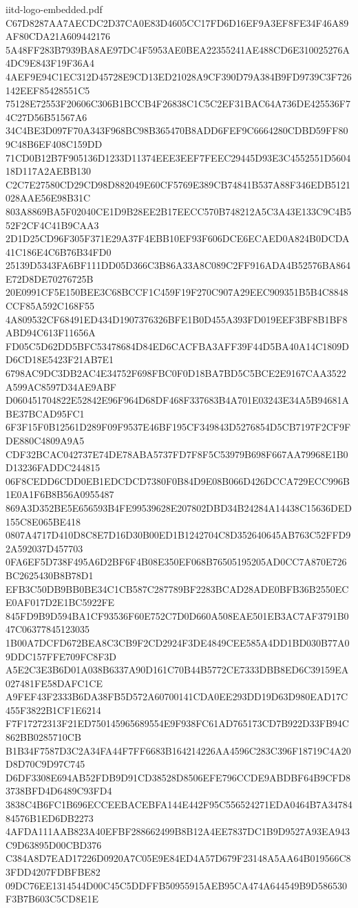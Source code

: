 \begin{filecontents*}[overwrite]{iitd-logo-embedded.pdf}
C67D8287AA7AECDC2D37CA0E83D4605CC17FD6D16EF9A3EF8FE34F46A89AF80CDA21A609442176
5A48FF283B7939BA8AE97DC4F5953AE0BEA22355241AE488CD6E310025276A4DC9E843F19F36A4
4AEF9E94C1EC312D45728E9CD13ED21028A9CF390D79A384B9FD9739C3F726142EEF85428551C5
75128E72553F20606C306B1BCCB4F26838C1C5C2EF31BAC64A736DE425536F74C27D56B51567A6
34C4BE3D097F70A343F968BC98B365470B8ADD6FEF9C6664280CDBD59FF809C48B6EF408C159DD
71CD0B12B7F905136D1233D11374EEE3EEF7FEEC29445D93E3C4552551D560418D117A2AEBB130
C2C7E27580CD29CD98D882049E60CF5769E389CB74841B537A88F346EDB5121028AAE56E98B31C
803A8869BA5F02040CE1D9B28EE2B17EECC570B748212A5C3A43E133C9C4B552F2CF4C41B9CAA3
2D1D25CD96F305F371E29A37F4EBB10EF93F606DCE6ECAED0A824B0DCDA41C186E4C6B76B34FD0
25139D5343FA6BF111DD05D366C3B86A33A8C089C2FF916ADA4B52576BA864E72D8DE70276725B
20E0991CF5E150BEE3C68BCCF1C459F19F270C907A29EEC909351B5B4C8848CCF85A592C168F55
4A809532CF68491ED434D1907376326BFE1B0D455A393FD019EEF3BF8B1BF8ABD94C613F11656A
FD05C5D62DD5BFC53478684D84ED6CACFBA3AFF39F44D5BA40A14C1809DD6CD18E5423F21AB7E1
6798AC9DC3DB2AC4E34752F698FBC0F0D18BA7BD5C5BCE2E9167CAA3522A599AC8597D34AE9ABF
D060451704822E52842E96F964D68DF468F337683B4A701E03243E34A5B94681ABE37BCAD95FC1
6F3F15F0B12561D289F09F9537E46BF195CF349843D5276854D5CB7197F2CF9FDE880C4809A9A5
CDF32BCAC042737E74DE78ABA5737FD7F8F5C53979B698F667AA79968E1B0D13236FADDC244815
06F8CEDD6CDD0EB1EDCDCD7380F0B84D9E08B066D426DCCA729ECC996B1E0A1F6B8B56A0955487
869A3D352BE5E656593B4FE99539628E207802DBD34B24284A14438C15636DED155C8E065BE418
0807A4717D410D8C8E7D16D30B00ED1B1242704C8D352640645AB763C52FFD92A592037D457703
0FA6EF5D738F495A6D2BF6F4B08E350EF068B76505195205AD0CC7A870E726BC2625430B8B78D1
EFB3C50DB9BB0BE34C1CB587C287789BF2283BCAD28ADE0BFB36B2550ECE0AF017D2E1BC5922FE
845FD9B9D594BA1CF93536F60E752C7D0D660A508EAE501EB3AC7AF3791B047C06377845123035
1B00A7DCFD672BEA8C3CB9F2CD2924F3DE4849CEE585A4DD1BD030B77A09DDC157FFE709FC8F3D
A5E2C3E3B6D01A038B6337A90D161C70B44B5772CE7333DBB8ED6C39159EA027481FE58DAFC1CE
A9FEF43F2333B6DA38FB5D572A60700141CDA0EE293DD19D63D980EAD17C455F3822B1CF1E6214
F7F17272313F21ED750145965689554E9F938FC61AD765173CD7B922D33FB94C862BB0285710CB
B1B34F7587D3C2A34FA44F7FF6683B164214226AA4596C283C396F18719C4A20D8D70C9D97C745
D6DF3308E694AB52FDB9D91CD38528D8506EFE796CCDE9ABDBF64B9CFD83738BFD4D6489C93FD4
3838C4B6FC1B696ECCEEBACEBFA144E442F95C556524271EDA0464B7A3478484576B1ED6DB2273
4AFDA111AAB823A40EFBF288662499B8B12A4EE7837DC1B9D9527A93EA943C9D63895D00CBD376
C384A8D7EAD17226D0920A7C05E9E84ED4A57D679F23148A5AA64B019566C83FDD4207FDBFBE82
09DC76EE1314544D00C45C5DDFFB50955915AEB95CA474A644549B9D586530F3B7B603C5CD8E1E

\end{filecontents*}
